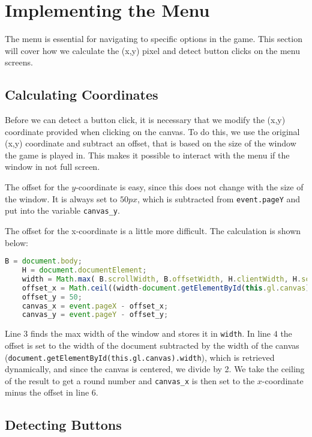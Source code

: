 \section{Implementing the Menu}
\label{sec:imp_menu}

The menu is essential for navigating to specific options in the game. This section will cover how we calculate the (x,y) pixel and detect button clicks on the menu screens.

\subsection{Calculating Coordinates}

Before we can detect a button click, it is necessary that we modify the (x,y) coordinate provided when clicking on the canvas. To do this, we use the original (x,y) coordinate and subtract an offset, that is based on the size of the window the game is played in. This makes it possible to interact with the menu if the window in not full screen.

The offset for the $y$-coordinate is easy, since this does not change with the size of the window. It is always set to $50px$, which is subtracted from \verb|event.pageY| and put into the variable \verb|canvas_y|.\newline

The offset for the x-coordinate is a little more difficult. The calculation is shown below:

\begin{lstlisting}[language=JavaScript, caption=function: doMouseDown(event)]
	B = document.body;
	H = document.documentElement;
	width = Math.max( B.scrollWidth, B.offsetWidth, H.clientWidth, H.scrollWidth, H.offsetWidth);
	offset_x = Math.ceil((width-document.getElementById(this.gl.canvas).width)/2);
	offset_y = 50;
	canvas_x = event.pageX - offset_x;
	canvas_y = event.pageY - offset_y;
\end{lstlisting}
 
Line $3$ finds the max width of the window and stores it in \verb|width|. In line $4$ the offset is set to the width of the document subtracted by the width of the canvas (\verb|document.getElementById(this.gl.canvas).width|), which is retrieved dynamically, and since the canvas is centered, we divide by 2. We take the ceiling of the result to get a round number and \verb|canvas_x| is then set to the $x$-coordinate minus the offset in line $6$.

\subsection{Detecting Buttons}

